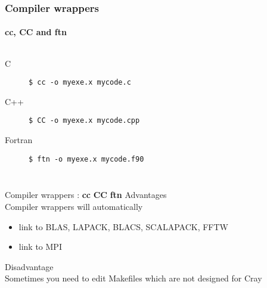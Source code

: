 \begin{frame}[fragile]
\frametitle{Compiler wrappers}
\framesubtitle{cc, CC and ftn}
\begin{columns}[t]
  \begin{description}
      \item [C] \verb|$ cc -o myexe.x mycode.c|
      \item [C++] \verb|$ CC -o myexe.x mycode.cpp|
      \item [Fortran] \verb|$ ftn -o myexe.x mycode.f90|
  \end{description}
\end{columns}
  \begin{exampleblock}{Compiler wrappers : \alert{\textbf{cc} \textbf{CC} \textbf{ftn}}}
    \alert{Advantages}\\
    Compiler wrappers will automatically 
    \begin{itemize}
      \item link to BLAS, LAPACK, BLACS, SCALAPACK, FFTW\\
      \item link to MPI\\
    \end{itemize}
    \alert{Disadvantage}\\
    Sometimes you need to edit Makefiles which are not designed for Cray 
\end{exampleblock}
\end{frame}
